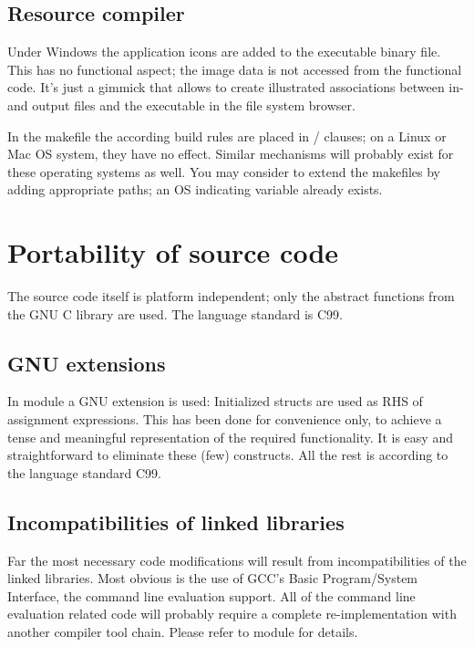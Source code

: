 \subsection{Resource compiler}

Under Windows the application icons are added to the executable binary
file. This has no functional aspect; the image data is not accessed from
the functional code. It's just a gimmick that allows to create illustrated
associations between \linnet{} in- and output files and the executable in
the file system browser.

In the makefile the according build rules are placed in
/ clauses; on a Linux or Mac OS system, they have no
effect. Similar mechanisms will probably exist for these operating systems
as well. You may consider to extend the makefiles by adding appropriate
 paths; an OS indicating variable already exists.


\section{Portability of source code}

The source code itself is platform independent; only the abstract
functions from the GNU C library are used. The language standard is C99.

\subsection{GNU extensions}

In module  a GNU extension is used: Initialized
structs are used as RHS of assignment expressions. This has been done for
convenience only, to achieve a tense and meaningful representation of the
required functionality. It is easy and straightforward to eliminate these
(few) constructs. All the rest is according to the language standard C99.

\subsection{Incompatibilities of linked libraries}

Far the most necessary code modifications will result from
incompatibilities of the linked libraries. Most obvious is the use of
GCC's Basic Program/System Interface, the command line evaluation support.
All of the command line evaluation related code will probably require a
complete re-implementation with another compiler tool chain. Please refer
to module  for details.

